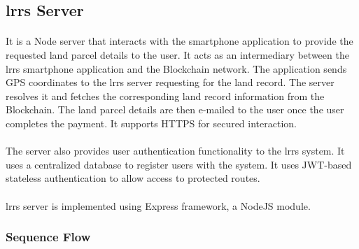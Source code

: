 \documentclass{article}
\begin{document}
    \subsection{\gls{lrrs} Server}
        \paragraph{}
        It is a Node server that interacts with the smartphone application to provide the requested land parcel details to the user. It acts as an intermediary between the \gls{lrrs} smartphone application and the Blockchain network. The application sends GPS coordinates to the \gls{lrrs} server requesting for the land record. The server resolves it and fetches the corresponding land record information from the Blockchain. The land parcel details are then e-mailed to the user once the user completes the payment. It supports HTTPS for secured interaction.
        
        \paragraph{}
        The server also provides user authentication functionality to the \gls{lrrs} system. It uses a centralized database to register users with the system. It uses JWT-based stateless authentication to allow access to protected routes.

        \paragraph{}
        \gls{lrrs} server is implemented using Express framework, a NodeJS module.
        
        \subsubsection{Sequence Flow}
\end{document}
